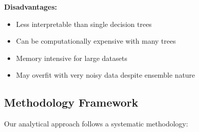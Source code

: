 \textbf{Disadvantages:}
\begin{itemize}
    \item Less interpretable than single decision trees
    \item Can be computationally expensive with many trees
    \item Memory intensive for large datasets
    \item May overfit with very noisy data despite ensemble nature \cite{ibm2024random}
\end{itemize}

\subsection{Methodology Framework}
Our analytical approach follows a systematic methodology:


